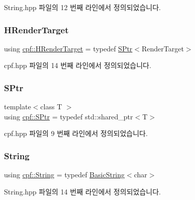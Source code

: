 String.\+hpp 파일의 12 번째 라인에서 정의되었습니다.

\mbox{\label{namespacecpf_a3f0ea2ea743b0adb7c12e52131d485b5}} 
\subsubsection{\texorpdfstring{H\+Render\+Target}{HRenderTarget}}
{\footnotesize\ttfamily using \hyperlink{namespacecpf_a3f0ea2ea743b0adb7c12e52131d485b5}{cpf\+::\+H\+Render\+Target} = typedef \hyperlink{namespacecpf_a91e72db639307e12a24546a0eebb1a42}{S\+Ptr}$<$Render\+Target$>$}



cpf.\+hpp 파일의 14 번째 라인에서 정의되었습니다.

\mbox{\label{namespacecpf_a91e72db639307e12a24546a0eebb1a42}} 
\subsubsection{\texorpdfstring{S\+Ptr}{SPtr}}
{\footnotesize\ttfamily template$<$class T $>$ \\
using \hyperlink{namespacecpf_a91e72db639307e12a24546a0eebb1a42}{cpf\+::\+S\+Ptr} = typedef std\+::shared\+\_\+ptr$<$T$>$}



cpf.\+hpp 파일의 9 번째 라인에서 정의되었습니다.

\mbox{\label{namespacecpf_a4dbd6992c3ed4440ce7ed8982ff7ffea}} 
\subsubsection{\texorpdfstring{String}{String}}
{\footnotesize\ttfamily using \hyperlink{namespacecpf_a4dbd6992c3ed4440ce7ed8982ff7ffea}{cpf\+::\+String} = typedef \hyperlink{namespacecpf_ac91c8c57a370a5bef21ac23f876ad536}{Basic\+String}$<$char$>$}



String.\+hpp 파일의 14 번째 라인에서 정의되었습니다.

\mbox{\label{namespacecpf_a6e5583a51165e808f1a480563a2d98b2}} 
